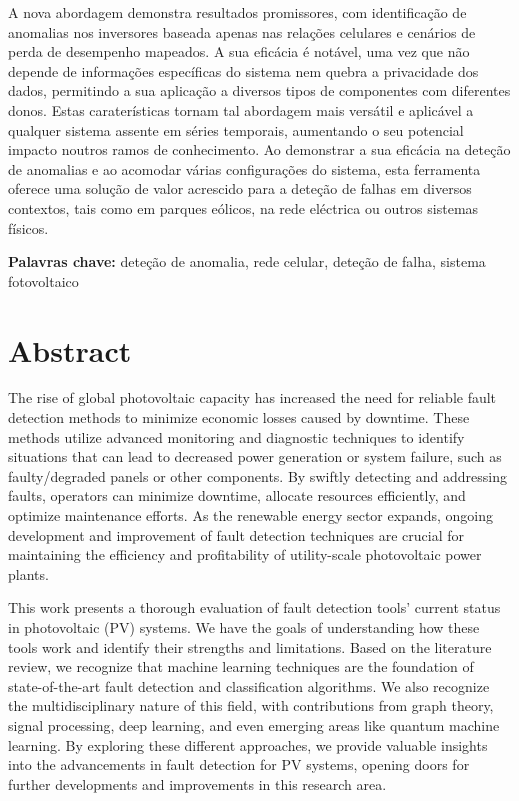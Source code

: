 A nova abordagem demonstra resultados promissores, com identificação de anomalias nos inversores baseada apenas nas relações celulares e cenários de perda de desempenho mapeados. A sua eficácia é notável, uma vez que não depende de informações específicas do sistema nem quebra a privacidade dos dados, permitindo a sua aplicação a diversos tipos de componentes com diferentes donos. Estas caraterísticas tornam tal abordagem mais versátil e aplicável a qualquer sistema assente em séries temporais, aumentando o seu potencial impacto noutros ramos de conhecimento. Ao demonstrar a sua eficácia na deteção de anomalias e ao acomodar várias configurações do sistema, esta ferramenta oferece uma solução de valor acrescido para a deteção de falhas em diversos contextos, tais como em parques eólicos, na rede eléctrica ou outros sistemas físicos.

\bigskip

\textbf{Palavras chave:} deteção de anomalia, rede celular, deteção de falha, sistema fotovoltaico

\chapter*{Abstract}
The rise of global photovoltaic capacity has increased the need for reliable fault detection methods to minimize economic losses caused by downtime. These methods utilize advanced monitoring and diagnostic techniques to identify situations that can lead to decreased power generation or system failure, such as faulty/degraded panels or other components. By swiftly detecting and addressing faults, operators can minimize downtime, allocate resources efficiently, and optimize maintenance efforts. As the renewable energy sector expands, ongoing development and improvement of fault detection techniques are crucial for maintaining the efficiency and profitability of utility-scale photovoltaic power plants.

This work presents a thorough evaluation of fault detection tools' current status in photovoltaic (PV) systems. We have the goals of understanding how these tools work and identify their strengths and limitations. Based on the literature review, we recognize that machine learning techniques are the foundation of state-of-the-art fault detection and classification algorithms. We also recognize the multidisciplinary nature of this field, with contributions from graph theory, signal processing, deep learning, and even emerging areas like quantum machine learning. By exploring these different approaches, we provide valuable insights into the advancements in fault detection for PV systems, opening doors for further developments and improvements in this research area.

